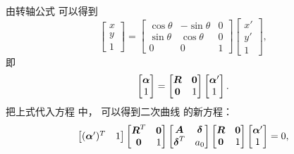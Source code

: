 由转轴公式 
可以得到\begin{equation*}
	\begin{bmatrix}
		x \\ y \\ 1
	\end{bmatrix}
	= \begin{bmatrix}
		\cos\theta & -\sin\theta & 0 \\
		\sin\theta & \cos\theta & 0 \\
		0 & 0 & 1
	\end{bmatrix}
	\begin{bmatrix}
		x' \\ y' \\ 1
	\end{bmatrix},
\end{equation*}
即\begin{equation*}
	\begin{bmatrix}
		\boldsymbol\alpha \\ 1
	\end{bmatrix}
	= \begin{bmatrix}
		\boldsymbol{R} & \boldsymbol0 \\
		\boldsymbol0 & 1
	\end{bmatrix}
	\begin{bmatrix}
		\boldsymbol\alpha' \\ 1
	\end{bmatrix}.
\end{equation*}
把上式代入方程  中，
可以得到二次曲线  的新方程：
\begin{equation}
	\begin{bmatrix}
		(\boldsymbol\alpha')^T & 1
	\end{bmatrix}
	\begin{bmatrix}
		\boldsymbol{R}^T & \boldsymbol0 \\
		\boldsymbol0 & 1
	\end{bmatrix}
	\begin{bmatrix}
		\boldsymbol{A} & \boldsymbol\delta \\
		\boldsymbol\delta^T & a_0
	\end{bmatrix}
	\begin{bmatrix}
		\boldsymbol{R} & \boldsymbol0 \\
		\boldsymbol0 & 1
	\end{bmatrix}
	\begin{bmatrix}
		\boldsymbol\alpha' \\ 1
	\end{bmatrix}
	= 0,
\end{equation}
